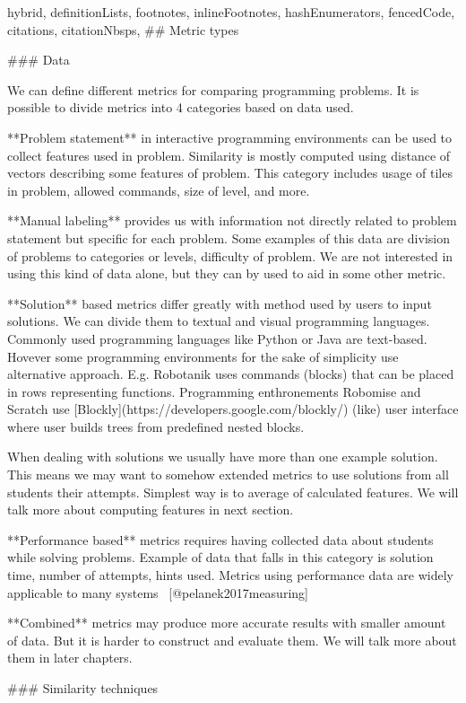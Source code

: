 \documentclass[
  digital, %
  table,   %
  lof,     %
  lot,     %
]{fithesis3}
\begin{document}
\begin{markdown*}{%
  hybrid,
  definitionLists,
  footnotes,
  inlineFootnotes,
  hashEnumerators,
  fencedCode,
  citations,
  citationNbsps,
}
## Metric types


### Data

We can define different metrics for comparing programming problems. It is possible to divide metrics into 4 categories based on data used.

**Problem statement** in interactive programming environments can be used to collect features used in problem. Similarity is mostly computed using distance of vectors describing some features of problem. This category includes usage of tiles in problem, allowed commands, size of level, and more.

**Manual labeling** provides us with information not directly related to problem statement but specific for each problem. Some examples of this data are division of problems to categories or levels, difficulty of problem. We are not interested in using this kind of data alone, but they can by used to aid in some other metric.

**Solution** based metrics differ greatly with method used by users to input solutions. We can divide them to textual and visual programming languages. Commonly used programming languages like Python or Java are text-based. Hovever some programming environments for the sake of simplicity use alternative approach. E.g. Robotanik uses commands (blocks) that can be placed in rows representing functions. Programming enthronements Robomise and Scratch use [Blockly](https://developers.google.com/blockly/) (like) user interface where user builds trees from predefined nested blocks.

When dealing with solutions we usually have more than one example solution. This means we may want to somehow extended metrics to use solutions from all students their attempts. Simplest way is to average of calculated features. We will talk more about computing features in next section.

**Performance based** metrics requires having collected data about students while solving problems. Example of data that falls in this category is solution time, number of attempts, hints used. Metrics using performance data are widely applicable to many systems ~[@pelanek2017measuring]

**Combined** metrics may produce more accurate results with smaller amount of data. But it is harder to construct and evaluate them. We will talk more about them in later chapters.

### Similarity techniques


\end{markdown*}
\end{document}
